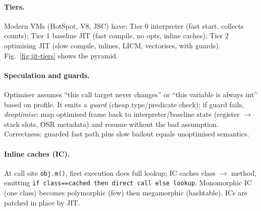 \paragraph{Tiers.} Modern VMs (HotSpot, V8, JSC) have: Tier 0 interpreter (fast start, collects counts); Tier 1 baseline JIT (fast compile, no opts, inline caches); Tier 2 optimising JIT (slow compile, inlines, LICM, vectorises, with guards). Fig.~\ref{fig:jit-tiers} shows the pyramid.

\paragraph{Speculation and guards.} Optimiser assumes ``this call target never changes'' or ``this variable is always int'' based on profile. It emits a \emph{guard} (cheap type/predicate check); if guard fails, \emph{deoptimise}: map optimised frame back to interpreter/baseline state (register $\to$ stack slots, OSR metadata) and resume without the bad assumption. Correctness: guarded fast path plus slow bailout equals unoptimised semantics.

\paragraph{Inline caches (IC).} At call site \texttt{obj.m()}, first execution does full lookup; IC caches class $\to$ method, emitting \texttt{if class==cached then direct call else lookup}. Monomorphic IC (one class) becomes polymorphic (few) then megamorphic (hashtable). ICs are patched in place by JIT.

